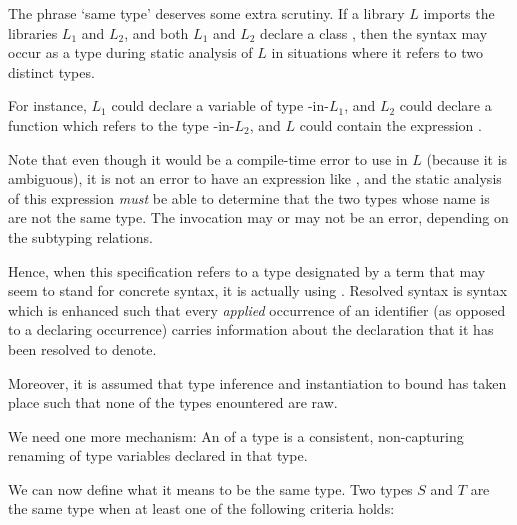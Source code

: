\documentclass[makeidx]{article}
\begin{document}
{{  The phrase `same type' deserves some extra scrutiny.
  If a library $L$ imports the libraries $L_1$ and $L_2$,
  and both $L_1$ and $L_2$ declare a class ,
  then the syntax  may occur as a type during static analysis of $L$
  in situations where it refers to two distinct types.

  For instance, $L_1$ could declare a variable 
  of type -in-$L_1$,
  and $L_2$ could declare a function
  which refers to the type -in-$L_2$,
  and $L$ could contain the expression .

  Note that even though it would be a compile-time error to use  in $L$
  (because it is ambiguous),
  it is not an error to have an expression like ,
  and the static analysis of this expression \emph{must}
  be able to determine that the two types whose name is  are
  not the same type. The invocation may or may not be an error,
  depending on the subtyping relations.%
}

\LMHash{}%
Hence, when this specification refers to
a type designated by a term
that may seem to stand for concrete syntax,
it is actually using .
Resolved syntax is syntax which is enhanced such that
every \emph{applied} occurrence of an identifier
(as opposed to a declaring occurrence)
carries information about the declaration
that it has been resolved to denote.

\LMHash{}%
Moreover, it is assumed that
type inference and instantiation to bound has taken place
such that none of the types enountered are raw.

\LMHash{}%
We need one more mechanism:
An  of a type is a consistent, non-capturing renaming
of type variables declared in that type.


\LMHash{}%
We can now define what it means to be the same type.
Two types $S$ and $T$ are the same type when
at least one of the following criteria holds:

}
\end{document}
